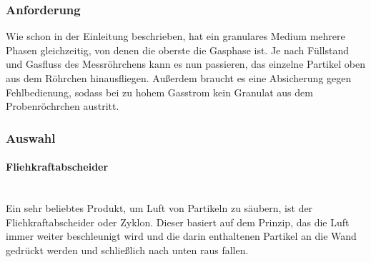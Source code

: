 \subsubsection{Anforderung}

Wie schon in der Einleitung beschrieben, hat ein granulares Medium mehrere Phasen gleichzeitig, von denen die oberste die Gasphase ist. Je nach Füllstand und Gasfluss des Messröhrchens kann es nun passieren, das einzelne Partikel oben aus dem Röhrchen hinausfliegen. Außerdem braucht es eine Absicherung gegen Fehlbedienung, sodass bei zu hohem Gasstrom kein Granulat aus dem Probenröchrchen austritt.

\subsubsection{Auswahl}

\paragraph{Fliehkraftabscheider} 

\hfill \\

Ein sehr beliebtes Produkt, um Luft von Partikeln zu säubern, ist der Fliehkraftabscheider oder Zyklon. Dieser basiert auf dem Prinzip, das die Luft immer weiter beschleunigt wird und die darin enthaltenen Partikel an die Wand gedrückt werden und schließlich nach unten raus fallen. \\


